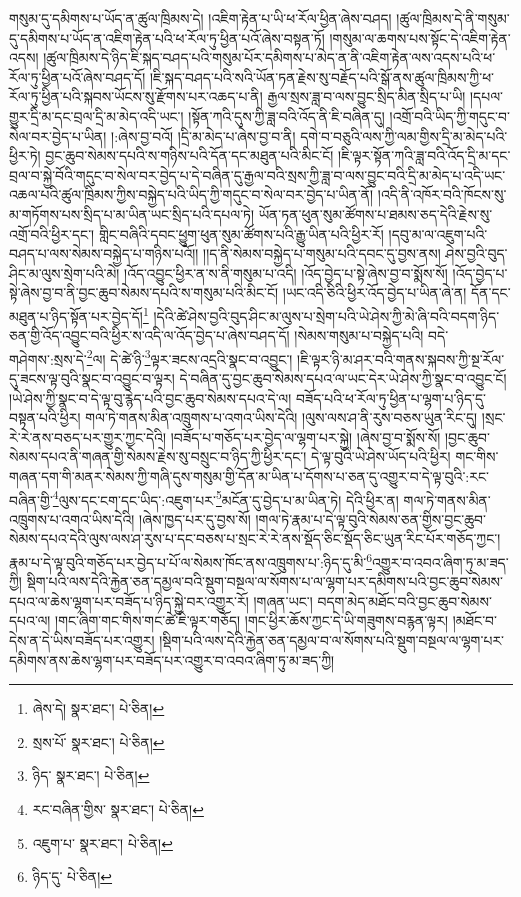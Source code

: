 གསུམ་དུ་དམིགས་པ་ཡོད་ན་ཚུལ་ཁྲིམས་དེ། །འཇིག་རྟེན་པ་ཡི་ཕ་རོལ་ཕྱིན་ཞེས་བཤད། །ཚུལ་ཁྲིམས་དེ་ནི་གསུམ་དུ་དམིགས་པ་ཡོད་ན་འཇིག་རྟེན་པའི་ཕ་རོལ་ཏུ་ཕྱིན་པའོ་ཞེས་བསྟན་ཏོ། །གསུམ་ལ་ཆགས་པས་སྟོང་དེ་འཇིག་རྟེན་འདས། །ཚུལ་ཁྲིམས་དེ་ཉིད་ཇི་སྐད་བཤད་པའི་གསུམ་པོར་དམིགས་པ་མེད་ན་ནི་འཇིག་རྟེན་ལས་འདས་པའི་ཕ་རོལ་ཏུ་ཕྱིན་པའོ་ཞེས་བཤད་དོ། །ཇི་སྐད་བཤད་པའི་སའི་ཡོན་ཏན་རྗེས་སུ་བརྗོད་པའི་སྒོ་ནས་ཚུལ་ཁྲིམས་ཀྱི་ཕ་རོལ་ཏུ་ཕྱིན་པའི་སྐབས་ཡོངས་སུ་རྫོགས་པར་འཆད་པ་ནི། རྒྱལ་སྲས་ཟླ་བ་ལས་བྱུང་སྲིད་མིན་སྲིད་པ་ཡི། །དཔལ་གྱུར་དྲི་མ་དང་བྲལ་དྲི་མ་མེད་འདི་ཡང་། །སྟོན་ཀའི་དུས་ཀྱི་ཟླ་བའི་འོད་ནི་ཇི་བཞིན་དུ། །འགྲོ་བའི་ཡིད་ཀྱི་གདུང་བ་སེལ་བར་བྱེད་པ་ཡིན། །:ཞེས་བྱ་བའོ། །དྲི་མ་མེད་པ་ཞེས་བྱ་བ་ནི། དགེ་བ་བཅུའི་ལས་ཀྱི་ལམ་གྱིས་དྲི་མ་མེད་པའི་ཕྱིར་ཏེ། བྱང་ཆུབ་སེམས་དཔའི་ས་གཉིས་པའི་དོན་དང་མཐུན་པའི་མིང་ངོ། །ཇི་ལྟར་སྟོན་ཀའི་ཟླ་བའི་འོད་དྲི་མ་དང་བྲལ་བ་སྐྱེ་བོའི་གདུང་བ་སེལ་བར་བྱེད་པ་དེ་བཞིན་དུ་རྒྱལ་བའི་སྲས་ཀྱི་ཟླ་བ་ལས་བྱུང་བའི་དྲི་མ་མེད་པ་འདི་ཡང་འཆལ་པའི་ཚུལ་ཁྲིམས་ཀྱིས་བསྐྱེད་པའི་ཡིད་ཀྱི་གདུང་བ་སེལ་བར་བྱེད་པ་ཡིན་ནོ། །འདི་ནི་འཁོར་བའི་ཁོངས་སུ་མ་གཏོགས་པས་སྲིད་པ་མ་ཡིན་ཡང་སྲིད་པའི་དཔལ་ཏེ། ཡོན་ཏན་ཕུན་སུམ་ཚོགས་པ་ཐམས་ཅད་དེའི་རྗེས་སུ་འགྲོ་བའི་ཕྱིར་དང་། གླིང་བཞིའི་དབང་ཕྱུག་ཕུན་སུམ་ཚོགས་པའི་རྒྱུ་ཡིན་པའི་ཕྱིར་རོ། །དབུ་མ་ལ་འཇུག་པའི་བཤད་པ་ལས་སེམས་བསྐྱེད་པ་གཉིས་པའོ།། །།ད་ནི་སེམས་བསྐྱེད་པ་གསུམ་པའི་དབང་དུ་བྱས་ནས། ཤེས་བྱའི་བུད་ཤིང་མ་ལུས་སྲེག་པའི་མེ། །འོད་འབྱུང་ཕྱིར་ན་ས་ནི་གསུམ་པ་འདི། །འོད་བྱེད་པ་སྟེ་ཞེས་བྱ་བ་སྨོས་སོ། །འོད་བྱེད་པ་སྟེ་ཞེས་བྱ་བ་ནི་བྱང་ཆུབ་སེམས་དཔའི་ས་གསུམ་པའི་མིང་ངོ། །ཡང་འདི་ཅིའི་ཕྱིར་འོད་བྱེད་པ་ཡིན་ཞེ་ན། དོན་དང་མཐུན་པ་ཉིད་སྟོན་པར་བྱེད་དོ།\footnote{ཞེས་དེ།  སྣར་ཐང་།  པེ་ཅིན། } །དེའི་ཚེ་ཤེས་བྱའི་བུད་ཤིང་མ་ལུས་པ་སྲེག་པའི་ཡེ་ཤེས་ཀྱི་མེ་ཞི་བའི་བདག་ཉིད་ཅན་གྱི་འོད་འབྱུང་བའི་ཕྱིར་ས་འདི་ལ་འོད་བྱེད་པ་ཞེས་བཤད་དོ། །སེམས་གསུམ་པ་བསྐྱེད་པའི། བདེ་གཤེགས་:སྲས་དེ་\footnote{སྲས་པོ་  སྣར་ཐང་།  པེ་ཅིན། }ལ། དེ་ཚེ་ཉི་\footnote{ཉིད་  སྣར་ཐང་།  པེ་ཅིན། }ལྟར་ཟངས་འདྲའི་སྣང་བ་འབྱུང་། །ཇི་ལྟར་ཉི་མ་ཤར་བའི་གནས་སྐབས་ཀྱི་སྔ་རོལ་དུ་ཟངས་ལྟ་བུའི་སྣང་བ་འབྱུང་བ་ལྟར། དེ་བཞིན་དུ་བྱང་ཆུབ་སེམས་དཔའ་ལ་ཡང་དེར་ཡེ་ཤེས་ཀྱི་སྣང་བ་འབྱུང་ངོ། །ཡེ་ཤེས་ཀྱི་སྣང་བ་དེ་ལྟ་བུ་རྙེད་པའི་བྱང་ཆུབ་སེམས་དཔའ་དེ་ལ། བཟོད་པའི་ཕ་རོལ་ཏུ་ཕྱིན་པ་ལྷག་པ་ཉིད་དུ་བསྟན་པའི་ཕྱིར། གལ་ཏེ་གནས་མིན་འཁྲུགས་པ་འགའ་ཡིས་དེའི། །ལུས་ལས་ཤ་ནི་རུས་བཅས་ཡུན་རིང་དུ། །སྲང་རེ་རེ་ནས་བཅད་པར་གྱུར་ཀྱང་དེའི། །བཟོད་པ་གཅོད་པར་བྱེད་ལ་ལྷག་པར་སྐྱེ། །ཞེས་བྱ་བ་སྨོས་སོ། །བྱང་ཆུབ་སེམས་དཔའ་ནི་གཞན་གྱི་སེམས་རྗེས་སུ་བསྲུང་བ་ཉིད་ཀྱི་ཕྱིར་དང་། དེ་ལྟ་བུའི་ཡེ་ཤེས་ཡོད་པའི་ཕྱིར། གང་གིས་གཞན་དག་གི་མནར་སེམས་ཀྱི་གཞི་དུས་གསུམ་གྱི་དོན་མ་ཡིན་པ་དོགས་པ་ཅན་དུ་འགྱུར་བ་དེ་ལྟ་བུའི་:རང་བཞིན་གྱི་\footnote{རང་བཞིན་གྱིས་  སྣར་ཐང་།  པེ་ཅིན། }ལུས་དང་ངག་དང་ཡིད་:འཇུག་པར་\footnote{འཇུག་པ་  སྣར་ཐང་།  པེ་ཅིན། }མངོན་དུ་བྱེད་པ་མ་ཡིན་ཏེ། དེའི་ཕྱིར་ན། གལ་ཏེ་གནས་མིན་འཁྲུགས་པ་འགའ་ཡིས་དེའི། །ཞེས་ཁྱད་པར་དུ་བྱས་སོ། །གལ་ཏེ་རྣམ་པ་དེ་ལྟ་བུའི་སེམས་ཅན་གྱིས་བྱང་ཆུབ་སེམས་དཔའ་དེའི་ལུས་ལས་ཤ་རུས་པ་དང་བཅས་པ་སྲང་རེ་རེ་ནས་སྡོད་ཅིང་སྡོད་ཅིང་ཡུན་རིང་པོར་གཅོད་ཀྱང་། རྣམ་པ་དེ་ལྟ་བུའི་གཅོད་པར་བྱེད་པ་པོ་ལ་སེམས་ཁོང་ནས་འཁྲུགས་པ་:ཉིད་དུ་མི་\footnote{ཉིད་དུ་  པེ་ཅིན། }འགྱུར་བ་འབའ་ཞིག་ཏུ་མ་ཟད་ཀྱི། སྡིག་པའི་ལས་དེའི་རྐྱེན་ཅན་དམྱལ་བའི་སྡུག་བསྔལ་ལ་སོགས་པ་ལ་ལྷག་པར་དམིགས་པའི་བྱང་ཆུབ་སེམས་དཔའ་ལ་ཆེས་ལྷག་པར་བཟོད་པ་ཉིད་སྐྱེ་བར་འགྱུར་རོ། །གཞན་ཡང་། བདག་མེད་མཐོང་བའི་བྱང་ཆུབ་སེམས་དཔའ་ལ། །གང་ཞིག་གང་གིས་གང་ཚེ་ཇི་ལྟར་གཅོད། །གང་ཕྱིར་ཆོས་ཀྱང་དེ་ཡི་གཟུགས་བརྙན་ལྟར། །མཐོང་བ་དེས་ན་དེ་ཡིས་བཟོད་པར་འགྱུར། །སྡིག་པའི་ལས་དེའི་རྐྱེན་ཅན་དམྱལ་བ་ལ་སོགས་པའི་སྡུག་བསྔལ་ལ་ལྷག་པར་དམིགས་ནས་ཆེས་ལྷག་པར་བཟོད་པར་འགྱུར་བ་འབའ་ཞིག་ཏུ་མ་ཟད་ཀྱི། 
